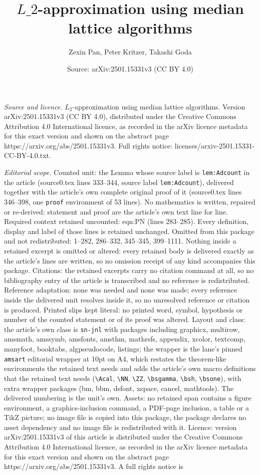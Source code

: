 \documentclass[10pt,a4paper]{amsart}
\title[$L\_2$-approximation using median lattice algorithms]{$L\_2$-approximation using median lattice algorithms}
\author{Zexin Pan, Peter Kritzer, Takashi Goda}
\date{Source: arXiv:2501.15331v3 (CC BY 4.0)}
\begin{document}
\maketitle

\noindent\emph{Source and licence.} $L_2$-approximation using median lattice algorithms. Version arXiv:2501.15331v3 (CC BY 4.0), distributed under the Creative Commons Attribution 4.0 International licence, as recorded in the arXiv licence metadata for this exact version and shown on the abstract page https://arxiv.org/abs/2501.15331v3. Full rights notice: licenses/arxiv-2501.15331-CC-BY-4.0.txt.\par\smallskip

\noindent\textit{Editorial scope.} Counted unit: the Lemma whose source label is \texttt{lem:Adcount} in the article (source0.tex lines 333--344, source label \texttt{lem:Adcount}), delivered together with the article's own complete original proof of it (source0.tex lines 346--398, one \texttt{proof} environment of 53 lines). No mathematics is written, repaired or re-derived: statement and proof are the article's own text line for line. Required context retained uncounted: eqn:PN (lines 283--285). Every definition, display and label of those lines is retained unchanged. Omitted from this package and not redistributed: 1--282, 286--332, 345--345, 399--1111. Nothing inside a retained excerpt is omitted or altered: every retained body is delivered exactly as the article's lines are written, so no omission receipt of any kind accompanies this package. Citations: the retained excerpts carry no citation command at all, so no bibliography entry of the article is transcribed and no reference is redistributed. Reference adaptation: none was needed and none was made; every reference inside the delivered unit resolves inside it, so no unresolved reference or citation is produced. Printed slips kept literal: no printed word, symbol, hypothesis or number of the counted statement or of its proof was altered. Layout and class: the article's own class is \texttt{sn-jnl} with packages including graphicx, multirow, amsmath, amssymb, amsfonts, amsthm, mathrsfs, appendix, xcolor, textcomp, manyfoot, booktabs, algpseudocode, listings; the wrapper is the lane's pinned \texttt{amsart} editorial wrapper at 10pt on A4, which restates the theorem-like environments the retained text needs and adds the article's own macro definitions that the retained text needs (\texttt{\textbackslash Acal}, \texttt{\textbackslash NN}, \texttt{\textbackslash ZZ}, \texttt{\textbackslash bsgamma}, \texttt{\textbackslash bsh}, \texttt{\textbackslash bsone}), with extra wrapper packages (bm, bbm, dsfont, xspace, cancel, mathtools). The delivered numbering is the unit's own. Assets: no retained span contains a figure environment, a graphics-inclusion command, a PDF-page inclusion, a table or a TikZ picture; no image file is copied into this package, the package declares no asset dependency and no image file is redistributed with it. Licence: version arXiv:2501.15331v3 of this article is distributed under the Creative Commons Attribution 4.0 International licence, as recorded in the arXiv licence metadata for this exact version and shown on the abstract page https://arxiv.org/abs/2501.15331v3. A full rights notice is 
\end{document}
